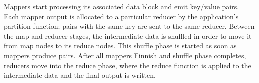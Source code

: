 Mappers start processing its associated data block and emit key/value pairs. Each mapper output is allocated to a particular reducer by the application's partition function; pairs with the same key are sent to the same reducer. Between the map and reducer stages, the intermediate data is shuffled in order to move it from map nodes to its reduce nodes. This shuffle phase is started as soon as mappers produce pairs. After all mappers Finnish and shuffle phase completes, reducers move into the reduce phase, where the reduce function is applied to the intermediate data and the final output is written.
\par





